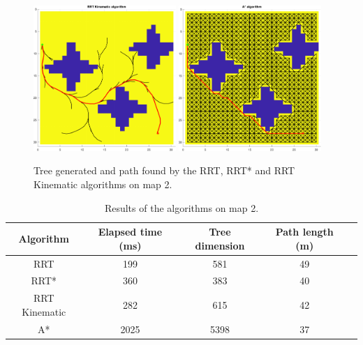 \begin{figure}[H]
    \includegraphics[width=0.48\textwidth]{./img/MATLAB/testing/02_RRT Kinematic.pdf}
    \hspace{6pt}
    \includegraphics[width=0.48\textwidth]{./img/MATLAB/testing/02_A.pdf}
    \caption{Tree generated and path found by the RRT, RRT* and RRT Kinematic algorithms on map 2.}
    \label{fig:map_2_results}
\end{figure}

\begin{table}[H]
    \centering
    \begin{tabular}{|c|c|c|c|c|}
        \hline
        \textbf{Algorithm} & \textbf{Elapsed time (ms)} & \textbf{Tree dimension} & \textbf{Path length (m)} \\
        \hline
        RRT                & 199                        & 581                     & 49                       \\
        RRT*               & 360                        & 383                     & 40                       \\
        RRT Kinematic      & 282                        & 615                     & 42                       \\
        \hline
        A*                 & 2025                       & 5398                    & 37                       \\
        \hline
    \end{tabular}
    \caption{Results of the algorithms on map 2.}
    \label{tab:map_2_results}
\end{table}

